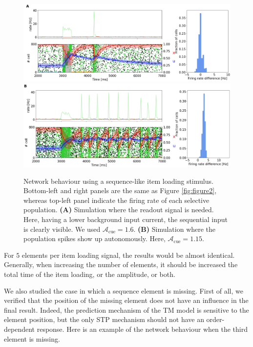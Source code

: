 \documentclass[a4paper, 12pt, twoside, openright]{book}
\begin{document}
\begin{figure}[H]
    \centering
    \includegraphics[width=0.9\columnwidth]{figures/seq_item_A.png}
    \includegraphics[width=0.9\columnwidth]{figures/seq_item_B.png}
    \caption{Network behaviour using a sequence-like item loading stimulus. Bottom-left and right panels are the same as Figure \ref{fig:figure2}, whereas top-left panel indicate the firing rate of each selective population. \textbf{(A)} Simulation where the readout signal is needed. Here, having a lower background input current, the sequential input is clearly visible. We used $\mathcal{A}_{\text{cue}}=1.6$. \textbf{(B)} Simulation where the population spikes show up autonomously. Here,  $\mathcal{A}_{\text{cue}}=1.15$.}
    \label{fig:seq_item_loading}
\end{figure}

For $5$ elements per item loading signal, the results would be almost identical. Generally, when increasing the number of elements, it should be increased the total time of the item loading, or the amplitude, or both.


We also studied the case in which a sequence element is missing. First of all, we verified that the position of the missing element does not have an influence in the final result. Indeed, the prediction mechanism of the TM model is sensitive to the element position, but the only STP mechanism should not have an order-dependent response. Here is an example of the network behaviour when the third element is missing.
\end{document}
